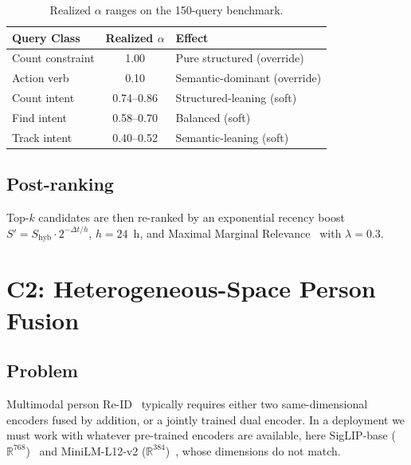 ﻿\documentclass[conference]{IEEEtran}
\theoremstyle{definition}
\begin{document}
\begin{table}[!t]
\caption{Realized $\alpha$ ranges on the 150-query benchmark.}
\label{tab:alpha}
\centering
\footnotesize
\begin{tabular}{@{}lc l@{}}
\toprule
Query Class & Realized $\alpha$ & Effect \\
\midrule
Count constraint & 1.00 & Pure structured (override) \\
Action verb      & 0.10 & Semantic-dominant (override) \\
Count intent     & 0.74--0.86 & Structured-leaning (soft) \\
Find intent      & 0.58--0.70 & Balanced (soft) \\
Track intent     & 0.40--0.52 & Semantic-leaning (soft) \\
\bottomrule
\end{tabular}
\end{table}

\subsection{Post-ranking}
Top-$k$ candidates are then re-ranked by an exponential recency boost $S' = S_{\text{hyb}}\cdot 2^{-\Delta t/h}$, $h{=}24$~h, and Maximal Marginal Relevance~\cite{b26} with $\lambda{=}0.3$.

\section{C2: Heterogeneous-Space Person Fusion}\label{sec:fusion}

\subsection{Problem}
Multimodal person Re-ID~\cite{b32,b33,b34,b35} typically requires either two same-dimensional encoders fused by addition, or a jointly trained dual encoder. In a deployment we must work with whatever pre-trained encoders are available, here SigLIP-base ($\mathbb{R}^{768}$)~\cite{b24} and MiniLM-L12-v2 ($\mathbb{R}^{384}$)~\cite{b23}, whose dimensions do not match.
\end{document}
